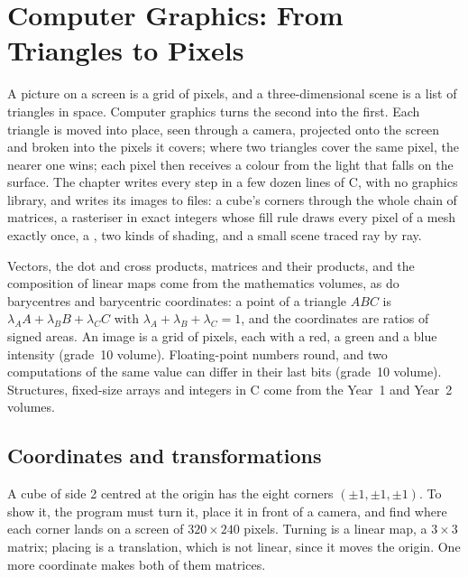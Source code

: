 \chapter{Computer Graphics: From Triangles to Pixels}\label{ch:b3:computer-graphics}

A picture on a screen is a grid of pixels, and a three-dimensional scene is a list of triangles in space. Computer graphics turns the second into the first. Each triangle is moved into place, seen through a camera, projected onto the screen and broken into the pixels it covers; where two triangles cover the same pixel, the nearer one wins; each pixel then receives a colour from the light that falls on the surface. The chapter writes every step in a few dozen lines of C, with no graphics library, and writes its images to files: a cube's corners through the whole chain of matrices, a rasteriser in exact integers whose fill rule draws every pixel of a mesh exactly once, a , two kinds of shading, and a small scene traced ray by ray.

\begin{recall}
Vectors, the dot and cross products, matrices and their products, and the composition of linear maps come from the mathematics volumes, as do barycentres and barycentric coordinates: a point of a triangle $ABC$ is $\lambda_A A + \lambda_B B + \lambda_C C$ with $\lambda_A + \lambda_B + \lambda_C = 1$, and the coordinates are ratios of signed areas. An image is a grid of pixels, each with a red, a green and a blue intensity (grade~10 volume). Floating-point numbers round, and two computations of the same value can differ in their last bits (grade~10 volume). Structures, fixed-size arrays and integers in C come from the Year~1 and Year~2 volumes.
\end{recall}

\section{Coordinates and transformations}\label{sec:b3:computer-graphics:transforms}

A cube of side 2 centred at the origin has the eight corners $(\pm1, \pm1, \pm1)$. To show it, the program must turn it, place it in front of a camera, and find where each corner lands on a screen of $320 \times 240$ pixels. Turning is a linear map, a $3 \times 3$ matrix; placing is a translation, which is not linear, since it moves the origin. One more coordinate makes both of them matrices.

